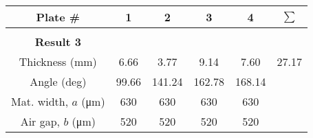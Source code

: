 \documentclass{standalone}
\begin{document}
    \begin{tabular}{c c c c c c }
        \toprule
        Plate \# & 1 & 2 & 3 & 4 & $\sum$ \\ 
        \midrule\\
        \textbf{Result 3}\\
        \addlinespace[1.5ex]
        Thickness (\si{\milli \meter}) & 6.66 & 3.77 & 9.14 & 7.60 & 27.17\\
        \addlinespace[1.5ex]
        Angle (deg) & 99.66 & 141.24 & 162.78 & 168.14 \\
        \midrule
        \addlinespace[1.5ex]
        Mat. width, $a$ (\si{\micro \meter}) & 630 & 630 & 630 & 630 \\
        \addlinespace[1.5ex]
        Air gap, $b$ (\si{\micro \meter}) & 520 & 520 & 520 & 520 \\
        \bottomrule
    \end{tabular}
\end{document}
